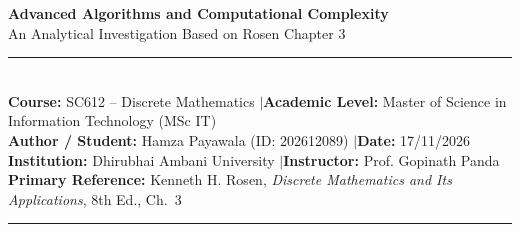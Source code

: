 \documentclass[10pt,a4paper]{article}
\theoremstyle{definition}
\begin{document}
\begin{center}
    {\Large\textbf{\color{primarydark} Advanced Algorithms and Computational Complexity}}\\[4pt]
    {\large An Analytical Investigation Based on Rosen Chapter 3}\\[8pt]
    \rule{0.9\textwidth}{0.8pt}\\[8pt]
    \small
    \textbf{Course:} SC612 -- Discrete Mathematics \quad$|$\quad \textbf{Academic Level:} Master of Science in Information Technology (MSc IT)\\
    \textbf{Author / Student:} Hamza Payawala (ID: 202612089) \quad$|$\quad \textbf{Date:} 17/11/2026\\
    \textbf{Institution:} Dhirubhai Ambani University \quad$|$\quad \textbf{Instructor:} Prof. Gopinath Panda\\
    \textbf{Primary Reference:} Kenneth H. Rosen, \textit{Discrete Mathematics and Its Applications}, 8th Ed., Ch.~3
    \vspace{4pt}
    \rule{0.9\textwidth}{0.8pt}
\end{center}

\vspace{-4pt}
\begin{abstract}
\noindent This academic assignment develops a rigorous examination of computational algorithms, algorithmic taxonomy, the asymptotic growth of functions, and computational complexity theory, based on Chapter 3 of Kenneth H. Rosen's \textit{Discrete Mathematics and Its Applications} (8th Edition). We formalize the mechanical definition of algorithms and examine their seven fundamental properties. We analyze foundational searching (Linear and Binary Search), sorting (Bubble Sort and Insertion Sort), and the Greedy paradigm via the Cashier's algorithm, establishing formal optimality criteria for canonical currency systems and counterexamples for non-canonical denominations. In asymptotic analysis, we rigorously define Big-$O$, Big-$\Omega$, and Big-$\Theta$, providing step-by-step witness proofs $(C, k)$ and analyzing the growth hierarchy under fixed constants $b > 2$ and $c > 1$. Finally, computational complexity is dimensioned across Time and Space in the Random Access Machine (RAM) model, deriving exact operation counts for Best, Average, and Worst cases, including the $\Theta(n)$ best-case of optimized Bubble Sort with $n-1$ comparisons and zero swaps.
\end{abstract}
\end{document}
